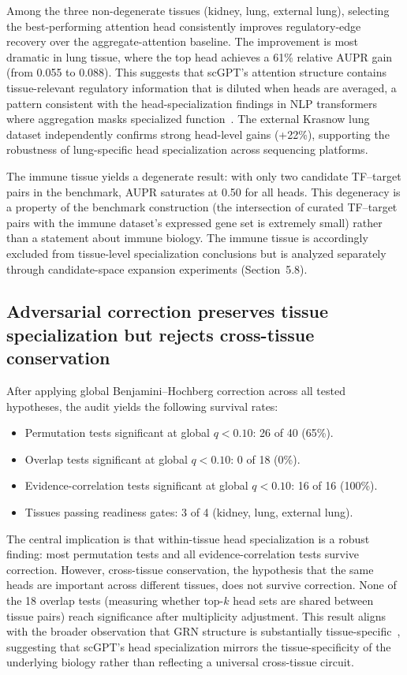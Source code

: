 \documentclass[11pt]{article}
\begin{document}
Among the three non-degenerate tissues (kidney, lung, external lung), selecting the best-performing attention head consistently improves regulatory-edge recovery over the aggregate-attention baseline. The improvement is most dramatic in lung tissue, where the top head achieves a 61\% relative AUPR gain (from 0.055 to 0.088). This suggests that scGPT's attention structure contains tissue-relevant regulatory information that is diluted when heads are averaged, a pattern consistent with the head-specialization findings in NLP transformers where aggregation masks specialized function~\cite{voita2019heads}. The external Krasnow lung dataset independently confirms strong head-level gains (+22\%), supporting the robustness of lung-specific head specialization across sequencing platforms.

The immune tissue yields a degenerate result: with only two candidate TF--target pairs in the benchmark, AUPR saturates at 0.50 for all heads. This degeneracy is a property of the benchmark construction (the intersection of curated TF--target pairs with the immune dataset's expressed gene set is extremely small) rather than a statement about immune biology. The immune tissue is accordingly excluded from tissue-level specialization conclusions but is analyzed separately through candidate-space expansion experiments (Section~5.8).

\subsection{Adversarial correction preserves tissue specialization but rejects cross-tissue conservation}

After applying global Benjamini--Hochberg correction across all tested hypotheses, the audit yields the following survival rates:

\begin{itemize}
\item Permutation tests significant at global $q<0.10$: 26 of 40 (65\%).
\item Overlap tests significant at global $q<0.10$: 0 of 18 (0\%).
\item Evidence-correlation tests significant at global $q<0.10$: 16 of 16 (100\%).
\item Tissues passing readiness gates: 3 of 4 (kidney, lung, external lung).
\end{itemize}

The central implication is that within-tissue head specialization is a robust finding: most permutation tests and all evidence-correlation tests survive correction. However, cross-tissue conservation, the hypothesis that the same heads are important across different tissues, does not survive correction. None of the 18 overlap tests (measuring whether top-$k$ head sets are shared between tissue pairs) reach significance after multiplicity adjustment. This result aligns with the broader observation that GRN structure is substantially tissue-specific~\cite{aibar2017scenic,kamimoto2023celloracle}, suggesting that scGPT's head specialization mirrors the tissue-specificity of the underlying biology rather than reflecting a universal cross-tissue circuit.
\end{document}
